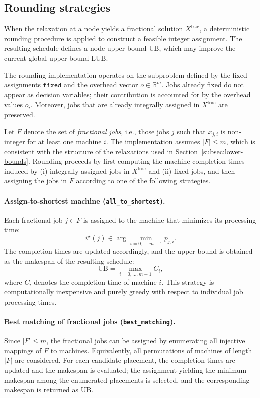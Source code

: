 \subsection{Rounding strategies}
\label{subsec:rounding-strategies}

When the relaxation at a node yields a fractional solution \(X^{\text{frac}}\), a deterministic rounding procedure is applied to construct a feasible integer assignment.
The resulting schedule defines a node upper bound \(\text{UB}\), which may improve the current global upper bound \(\text{LUB}\).

The rounding implementation operates on the subproblem defined by the fixed assignments \(\texttt{fixed}\) and the overhead vector \(o \in \mathbb{R}^m\).
Jobs already fixed do not appear as decision variables; their contribution is accounted for by the overhead values \(o_i\).
Moreover, jobs that are already integrally assigned in \(X^{\text{frac}}\) are preserved.

Let \(F\) denote the set of \emph{fractional jobs}, i.e., those jobs \(j\) such that \(x_{j,i}\) is non-integer for at least one machine \(i\).
The implementation assumes \(|F| \le m\), which is consistent with the structure of the relaxations used in Section~\ref{subsec:lower-bounds}.
Rounding proceeds by first computing the machine completion times induced by (i) integrally assigned jobs in \(X^{\text{frac}}\) and (ii) fixed jobs, and then assigning the jobs in \(F\) according to one of the following strategies.

\paragraph{Assign-to-shortest machine (\texttt{all\_to\_shortest}).}
Each fractional job \(j \in F\) is assigned to the machine that minimizes its processing time:
\[
  i^{\star}(j) \in \arg\min_{i = 0,\dots,m-1} p_{j,i}.
\]
The completion times are updated accordingly, and the upper bound is obtained as the makespan of the resulting schedule:
\[
  \text{UB} = \max_{i=0,\dots,m-1} C_i,
\]
where \(C_i\) denotes the completion time of machine \(i\).
This strategy is computationally inexpensive and purely greedy with respect to individual job processing times.

\paragraph{Best matching of fractional jobs (\texttt{best\_matching}).}
Since \(|F| \le m\), the fractional jobs can be assigned by enumerating all injective mappings of \(F\) to machines.
Equivalently, all permutations of machines of length \(|F|\) are considered.
For each candidate placement, the completion times are updated and the makespan is evaluated; the assignment yielding the minimum makespan among the enumerated placements is selected, and the corresponding makespan is returned as \(\text{UB}\).

